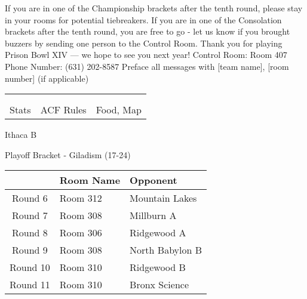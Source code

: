 \documentclass{article}%
\begin{document}
\vspace*{30pt}%
\linebreak%
If you are in one of the Championship brackets after the tenth round, please stay in your rooms for potential tiebreakers.\newline%
\newline%
If you are in one of the Consolation brackets after the tenth round, you are free to go {-} let us know if you brought buzzers by sending one person to the Control Room.\newline%
\newline%
Thank you for playing Prison Bowl XIV — we hope to see you next year!\newline%
\newline%
Control Room: Room 407\newline%
Phone Number: (631) 202{-}8587\newline%
Preface all messages with {[}team name{]}, {[}room number{]} (if applicable)%
\vspace*{30pt}%
\newline%
%
\begin{tabularx}{\textwidth}{YYY}%
  &  &  \\%
\\%
Stats&ACF Rules&Food, Map\\%
\end{tabularx}%
\newpage%
\begin{center}%
\begin{Huge}%
Ithaca B%
\end{Huge}%
\vspace*{12pt}%
\linebreak%
\begin{Large}%
Playoff Bracket {-} Giladism (17{-}24)%
\end{Large}%
\end{center}%
\vspace*{4pt}%
%
\begin{tabularx}{\textwidth}{|c|Y|Y|}%
\hline%
&Room Name&Opponent\\%
\hline%
Round 6&Room 312&Mountain Lakes\\%
Round 7&Room 308&Millburn A\\%
Round 8&Room 306&Ridgewood A\\%
Round 9&Room 308&North Babylon B\\%
Round 10&Room 310&Ridgewood B\\%
Round 11&Room 310&Bronx Science\\%
\hline%
\end{tabularx}%
\end{document}
